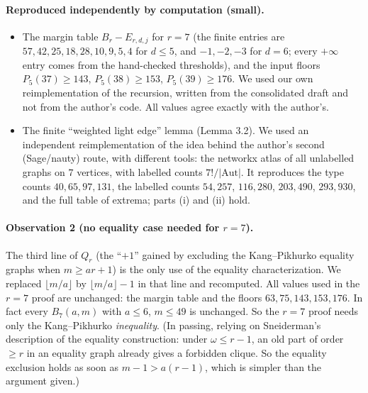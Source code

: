 \documentclass[11pt]{amsart}
\theoremstyle{remark}\newtheorem*{remark}{Remark}
\begin{document}
\paragraph{Reproduced independently by computation (small).}
\begin{itemize}
\item The margin table $B_r-E_{r,d,j}$ for $r=7$ (the finite entries are $57,42,25,18,28,10,9,5,4$ for $d\le5$, and $-1,-2,-3$ for $d=6$;
  every $+\infty$ entry comes from the hand-checked thresholds), and the input floors $P_5(37)\ge143$, $P_5(38)\ge153$, $P_5(39)\ge176$.
  We used our own reimplementation of the recursion, written from the consolidated draft and not from the author's code.
  All values agree exactly with the author's.
\item The finite ``weighted light edge'' lemma (Lemma 3.2). We used an independent reimplementation of the idea behind the author's second (Sage/nauty) route, with different tools: the networkx atlas of all
  unlabelled graphs on $7$ vertices, with labelled counts $7!/|\mathrm{Aut}|$. It reproduces the type counts $40,65,97,131$, the labelled
  counts $54{,}257$, $116{,}280$, $203{,}490$, $293{,}930$, and the full table of extrema; parts (i) and (ii) hold.
\end{itemize}

\paragraph{Observation 2 (no equality case needed for $r=7$).}
The third line of $Q_r$ (the ``$+1$'' gained by excluding the Kang--Pikhurko equality graphs when $m\ge ar+1$) is the only use of
the equality characterization. We replaced $\lfloor m/a\rfloor$ by $\lfloor m/a\rfloor-1$ in that line and recomputed. All
values used in the $r=7$ proof are unchanged: the margin table and the floors $63,75,143,153,176$. In fact every $B_7(a,m)$ with
$a\le6$, $m\le49$ is unchanged. So the $r=7$ proof needs only
the Kang--Pikhurko \emph{inequality}.
(In passing, relying on Sneiderman's description of the equality construction: under $\omega\le r-1$, an old part of order $\ge r$ in an equality graph already gives a forbidden clique. So the
equality exclusion holds as soon as $m-1>a(r-1)$, which is simpler than the argument given.)
\end{document}
